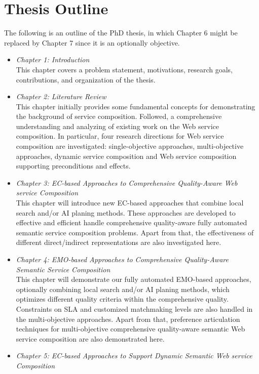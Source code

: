 \section{Thesis Outline}

The following is an outline of the PhD thesis,  in which Chapter 6 might be replaced by Chapter 7 since it is an optionally objective.

\begin{itemize}
 \item \textit{Chapter 1: Introduction}\\
 This chapter covers a problem statement, motivations, research goals, contributions, and organization of the thesis.
 \item \textit{Chapter 2: Literature Review}\\
This chapter initially provides some fundamental concepts for demonstrating the background of service composition. Followed, a comprehensive understanding and analyzing of existing work on the Web service composition.  In particular, four research directions for Web service composition are investigated: single-objective approaches, multi-objective approaches, dynamic service composition and Web service composition supporting preconditions and effects.
 \item \textit{Chapter 3: EC-based Approaches to Comprehensive Quality-Aware Web service Composition}\\
This chapter will introduce new EC-based approaches that combine local search and/or AI planing methods. These approaches are developed to effective and efficient handle comprehensive quality-aware fully automated semantic service composition problems. Apart from that, the effectiveness of different direct/indirect representations are also investigated here.
 \item \textit{Chapter 4: EMO-based Approaches to Comprehensive Quality-Aware Semantic Service Composition}\\
This chapter will demonstrate our fully automated EMO-based approaches, optionally combining local search and/or AI planing methods, which optimizes different quality criteria within the comprehensive quality. Constraints on SLA and customized matchmaking levels are also handled in the multi-objective approaches. Apart from that, preference articulation techniques for multi-objective comprehensive quality-aware semantic Web service composition are also demonstrated here.
 \item \textit{Chapter 5: EC-based Approaches to Support Dynamic Semantic Web service Composition}\\

\end{itemize}
